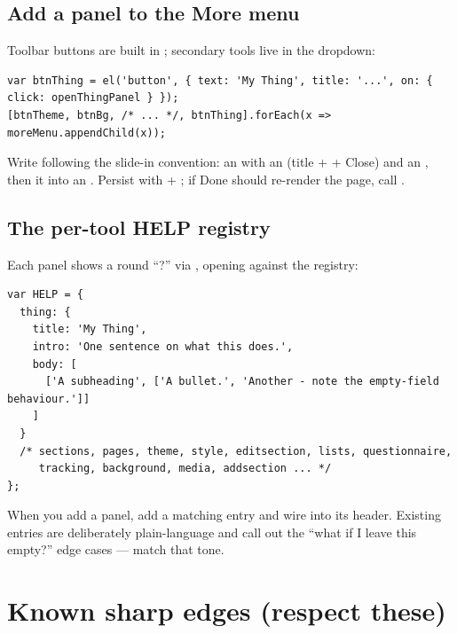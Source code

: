\documentclass[11pt]{article}
\begin{document}
\subsection{Add a panel to the More menu}

Toolbar buttons are built in ; secondary tools live in the
 dropdown:

\begin{lstlisting}
var btnThing = el('button', { text: 'My Thing', title: '...', on: { click: openThingPanel } });
[btnTheme, btnBg, /* ... */, btnThing].forEach(x => moreMenu.appendChild(x));
\end{lstlisting}

Write  following the slide-in convention: an
 with an  (title + 
+ Close) and an , then  it into an
. Persist with  + ;
if Done should re-render the page, call .

\subsection{The per-tool HELP registry}

Each panel shows a round ``?'' via , opening
 against the  registry:

\begin{lstlisting}
var HELP = {
  thing: {
    title: 'My Thing',
    intro: 'One sentence on what this does.',
    body: [
      ['A subheading', ['A bullet.', 'Another - note the empty-field behaviour.']]
    ]
  }
  /* sections, pages, theme, style, editsection, lists, questionnaire,
     tracking, background, media, addsection ... */
};
\end{lstlisting}

When you add a panel, add a matching  entry and wire
 into its header. Existing entries are deliberately
plain-language and call out the ``what if I leave this empty?'' edge cases ---
match that tone.

\section{Known sharp edges (respect these)}\label{sec:edges}
\end{document}
